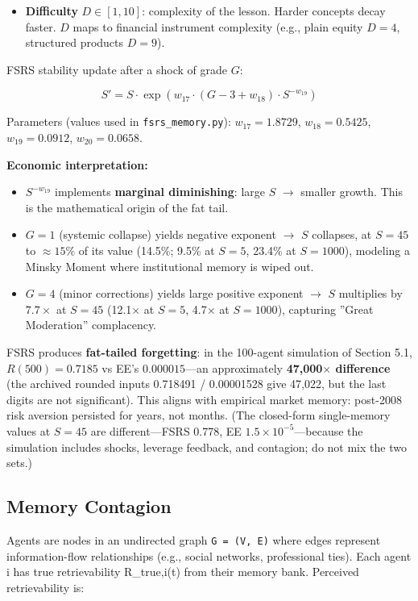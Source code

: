 \documentclass[11pt]{article}
\begin{document}
\begin{itemize}
\item \textbf{Difficulty} $D \in [1,10]$: complexity of the lesson. Harder concepts decay faster. $D$ maps to financial instrument complexity (e.g., plain equity $D=4$, structured products $D=9$).
\end{itemize}

FSRS stability update after a shock of grade $G$:

\[
S' = S \cdot \exp\left( w_{17} \cdot (G - 3 + w_{18}) \cdot S^{-w_{19}} \right)
\]

Parameters (values used in \texttt{fsrs\_memory.py}): $w_{17}=1.8729$, $w_{18}=0.5425$, $w_{19}=0.0912$, $w_{20}=0.0658$.

\textbf{Economic interpretation:}

\begin{itemize}
\item $S^{-w_{19}}$ implements \textbf{marginal diminishing}: large $S$ $\rightarrow$ smaller growth. This is the mathematical origin of the fat tail.
\item $G=1$ (systemic collapse) yields negative exponent $\rightarrow$ $S$ collapses, at $S=45$ to $\approx 15\%$ of its value (14.5\%; 9.5\% at $S=5$, 23.4\% at $S=1000$), modeling a Minsky Moment where institutional memory is wiped out.
\item $G=4$ (minor corrections) yields large positive exponent $\rightarrow$ $S$ multiplies by $7.7\times$ at $S=45$ (12.1$\times$ at $S=5$, 4.7$\times$ at $S=1000$), capturing ''Great Moderation'' complacency.
\end{itemize}

FSRS produces \textbf{fat-tailed forgetting}: in the 100-agent simulation of Section 5.1, $R(500) = 0.7185$ vs EE's $0.000015$---an approximately \textbf{47,000$\times$ difference} (the archived rounded inputs 0.718491 / 0.00001528 give 47,022, but the last digits are not significant). This aligns with empirical market memory: post-2008 risk aversion persisted for years, not months. (The closed-form single-memory values at $S=45$ are different---FSRS 0.778, EE $1.5 \times 10^{-5}$---because the simulation includes shocks, leverage feedback, and contagion; do not mix the two sets.)

\subsection{Memory Contagion}
Agents are nodes in an undirected graph \texttt{G = (V, E)} where edges represent information-flow relationships (e.g., social networks, professional ties). Each agent i has true retrievability R\_true,i(t) from their memory bank. Perceived retrievability is:
\end{document}
